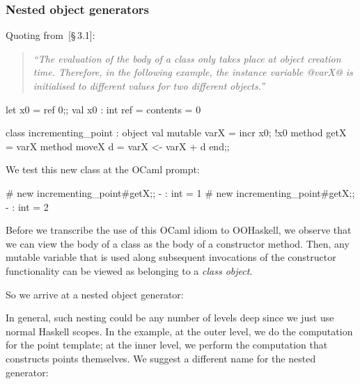 \documentclass{jfp}
\begin{document}
\subsubsection{Nested object generators}
\label{S:nested}

Quoting from~\cite{OCaml}[\S\,3.1]:

\begin{quote}\itshape\small
``The evaluation of the body of a class only takes place at object
creation time.  Therefore, in the following example, the instance
variable @varX@ is initialised to different values for two different
objects.''
\end{quote}

\begin{code}
 let x0 = ref 0;;
 val x0 : int ref = {contents = 0}
\end{code}

\begin{code}
 class incrementing_point :
   object
     val mutable varX = incr x0; !x0
     method getX      = varX
     method moveX d   = varX <- varX + d
   end;;
\end{code}

We test this new class at the OCaml prompt:

\begin{code}
 # new incrementing_point#getX;;
 - : int = 1
 # new incrementing_point#getX;;
 - : int = 2
\end{code}

Before we transcribe the use of this OCaml idiom to OOHaskell, we
observe that we can view the body of a class as the body of a
constructor method. Then, any mutable variable that is used along
subsequent invocations of the constructor functionality can be viewed
as belonging to a \emph{class object}.

So we arrive at a nested object generator:


In general, such nesting could be any number of levels deep since we
just use normal Haskell scopes. In the example, at the outer level, we
do the computation for the point template; at the inner level, we
perform the computation that constructs points themselves.
We suggest a different name for the nested generator:
\end{document}
